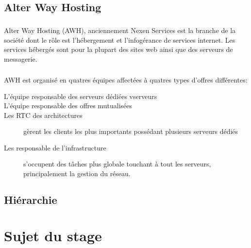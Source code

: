 \section{Alter Way Hosting}
\paragraph*{}
Alter Way Hosting (AWH), anciennement Nexen Services est la branche de la société dont le rôle est l'hébergement et l'infogérance de services internet.
Les services hébergés sont pour la plupart des sites web ainsi que des serveurs de messagerie.

\paragraph*{}
AWH est organisé en quatres équipes affectées à quatres types d'offres différentes:

\begin{description}
	\item[L'équipe responsable des serveurs dédiées vserveurs \footnotemark]
	\item[L'équipe responsable des offres mutualisées
		\footnotemark] 
	\item[Les RTC \footnotemark des architectures] 
		gèrent les clients les plus importants possédant plusieurs serveurs dédiés
	\item[Les responsable de l'infrastructure] s'occupent des tâches plus globale touchant à tout les serveurs,
		principalement la gestion du réseau.

\end{description}


\section{Hiérarchie}


\chapter{Sujet du stage}

